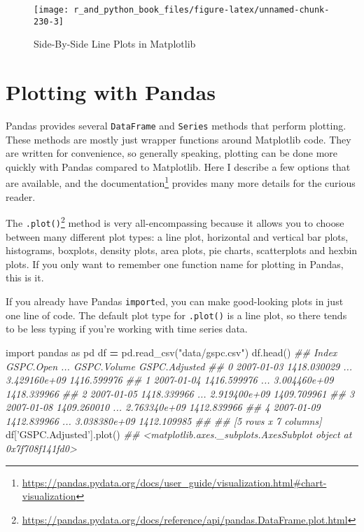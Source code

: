 \documentclass[12pt,krantz2]{krantz}
\makeatletter
\newenvironment{Shaded}{\begin{snugshade}}{\end{snugshade}}
\newcommand{\CommentTok}[1]{\textcolor[rgb]{0.37,0.37,0.37}{\textit{#1}}}
\newcommand{\ImportTok}[1]{#1}
\newcommand{\NormalTok}[1]{#1}
\newcommand{\OperatorTok}[1]{\textcolor[rgb]{0.43,0.43,0.43}{\textbf{#1}}}
\newcommand{\StringTok}[1]{\textcolor[rgb]{0.5,0.5,0.5}{#1}}
\renewcommand{\href}[2]{#2\footnote{\url{#1}}}
\newenvironment{kframe}{%
\medskip{}
\setlength{\fboxsep}{.8em}
 \def\at@end@of@kframe{}%
 \ifinner\ifhmode%
  \def\at@end@of@kframe{\end{minipage}}%
  \begin{minipage}{\columnwidth}%
 \fi\fi%
 \def\FrameCommand##1{\hskip\@totalleftmargin \hskip-\fboxsep
 \colorbox{shadecolor}{##1}\hskip-\fboxsep
     \hskip-\linewidth \hskip-\@totalleftmargin \hskip\columnwidth}%
 \MakeFramed {\advance\hsize-\width
   \@totalleftmargin\z@ \linewidth\hsize
   \@setminipage}}%
 {\par\unskip\endMakeFramed%
 \at@end@of@kframe}
\renewenvironment{Shaded}{\begin{kframe}}{\end{kframe}}
\makeatother
\begin{document}
\begin{figure}

{\centering \texttt{[image: r\_and\_python\_book\_files/figure-latex/unnamed-chunk-230-3]} 

}

\caption{Side-By-Side Line Plots in Matplotlib}\label{fig:unnamed-chunk-230}
\end{figure}

\hypertarget{plotting-with-pandas}{%
\section{Plotting with Pandas}\label{plotting-with-pandas}}

Pandas provides several \texttt{DataFrame} and \texttt{Series} methods that perform plotting. These methods are mostly just wrapper functions around Matplotlib code. They are written for convenience, so generally speaking, plotting can be done more quickly with Pandas compared to Matplotlib. Here I describe a few options that are available, and \href{https://pandas.pydata.org/docs/user_guide/visualization.html\#chart-visualization}{the documentation} provides many more details for the curious reader.

The \href{https://pandas.pydata.org/docs/reference/api/pandas.DataFrame.plot.html}{\texttt{.plot()}} method is very all-encompassing because it allows you to choose between many different plot types: a line plot, horizontal and vertical bar plots, histograms, boxplots, density plots, area plots, pie charts, scatterplots and hexbin plots. If you only want to remember one function name for plotting in Pandas, this is it.

If you already have Pandas \texttt{import}ed, you can make good-looking plots in just one line of code. The default plot type for \texttt{.plot()} is a line plot, so there tends to be less typing if you're working with time series data.

\begin{Shaded}
\begin{Highlighting}[]
\ImportTok{import}\NormalTok{ pandas }\ImportTok{as}\NormalTok{ pd}
\NormalTok{df }\OperatorTok{=}\NormalTok{ pd.read_csv(}\StringTok{"data/gspc.csv"}\NormalTok{)}
\NormalTok{df.head()}
\CommentTok{##         Index    GSPC.Open  ...   GSPC.Volume  GSPC.Adjusted}
\CommentTok{## 0  2007-01-03  1418.030029  ...  3.429160e+09    1416.599976}
\CommentTok{## 1  2007-01-04  1416.599976  ...  3.004460e+09    1418.339966}
\CommentTok{## 2  2007-01-05  1418.339966  ...  2.919400e+09    1409.709961}
\CommentTok{## 3  2007-01-08  1409.260010  ...  2.763340e+09    1412.839966}
\CommentTok{## 4  2007-01-09  1412.839966  ...  3.038380e+09    1412.109985}
\CommentTok{## }
\CommentTok{## [5 rows x 7 columns]}
\NormalTok{df[}\StringTok{'GSPC.Adjusted'}\NormalTok{].plot()}
\CommentTok{## <matplotlib.axes._subplots.AxesSubplot object at 0x7f708f141fd0>}
\end{Highlighting}
\end{Shaded}
\end{document}
